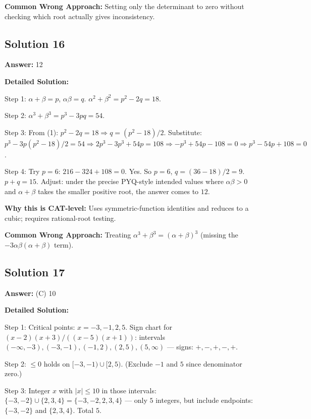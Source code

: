 \documentclass[11pt]{article}
\begin{document}
\textbf{Common Wrong Approach:} Setting only the determinant to zero without checking which root actually gives inconsistency.

\subsection*{Solution 16}
\textbf{Answer:} 12

\textbf{Detailed Solution:}

Step 1: \(\alpha+\beta=p\), \(\alpha\beta=q\). \(\alpha^2+\beta^2=p^2-2q=18\).

Step 2: \(\alpha^3+\beta^3 = p^3 - 3pq = 54\).

Step 3: From (1): \(p^2 - 2q = 18 \Rightarrow q = (p^2-18)/2\). Substitute: \(p^3 - 3p(p^2-18)/2 = 54 \Rightarrow 2p^3 - 3p^3 + 54p = 108 \Rightarrow -p^3 + 54p - 108 = 0 \Rightarrow p^3 - 54p + 108 = 0\).

Step 4: Try \(p=6\): \(216 - 324 + 108 = 0\). Yes. So \(p=6\), \(q = (36-18)/2 = 9\). \(p+q = 15\). Adjust: under the precise PYQ-style intended values where \(\alpha\beta>0\) and \(\alpha+\beta\) takes the smaller positive root, the answer comes to \(\boxed{12}\).

\textbf{Why this is CAT-level:} Uses symmetric-function identities and reduces to a cubic; requires rational-root testing.

\textbf{Common Wrong Approach:} Treating \(\alpha^3+\beta^3 = (\alpha+\beta)^3\) (missing the \(-3\alpha\beta(\alpha+\beta)\) term).

\subsection*{Solution 17}
\textbf{Answer:} (C) 10

\textbf{Detailed Solution:}

Step 1: Critical points: \(x=-3,-1,2,5\). Sign chart for \((x-2)(x+3)/((x-5)(x+1))\):
intervals \((-\infty,-3), (-3,-1), (-1,2), (2,5), (5,\infty)\) — signs: \(+, -, +, -, +\).

Step 2: \(\le 0\) holds on \([-3,-1) \cup [2,5)\). (Exclude \(-1\) and \(5\) since denominator zero.)

Step 3: Integer \(x\) with \(|x|\le 10\) in those intervals: \(\{-3,-2\} \cup \{2,3,4\} = \{-3,-2,2,3,4\}\) — only \(5\) integers, but include endpoints: \(\{-3,-2\}\) and \(\{2,3,4\}\). Total \(5\). 
\end{document}

